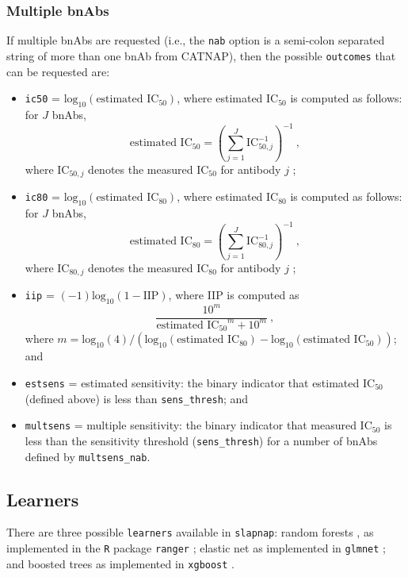 \documentclass[]{article}
\providecommand{\tightlist}{%
  \setlength{\itemsep}{0pt}\setlength{\parskip}{0pt}}
\begin{document}
\subsubsection{Multiple bnAbs}\label{multiple-bnabs}

If multiple bnAbs are requested (i.e., the \texttt{nab} option is a
semi-colon separated string of more than one bnAb from CATNAP), then the
possible \texttt{outcomes} that can be requested are:

\begin{itemize}
\tightlist
\item
  \texttt{ic50} = \(\mbox{log}_{10}(\mbox{estimated IC}_{50})\), where
  estimated IC\(_{50}\) is computed as follows: for \(J\) bnAbs,
  \[ \mbox{estimated IC}_{50} = \left( \sum_{j=1}^J \mbox{IC}_{50,j}^{-1} \right)^{-1} \ , \]
  where IC\(_{50,j}\) denotes the measured IC\(_{50}\) for antibody
  \(j\) \citep{wagh2016optimal};
\item
  \texttt{ic80} = \(\mbox{log}_{10}(\mbox{estimated IC}_{80})\), where
  estimated IC\(_{80}\) is computed as follows: for \(J\) bnAbs,
  \[ \mbox{estimated IC}_{80} = \left( \sum_{j=1}^J \mbox{IC}_{80,j}^{-1} \right)^{-1} \ , \]
  where IC\(_{80,j}\) denotes the measured IC\(_{80}\) for antibody
  \(j\) \citep{wagh2016optimal};
\item
  \texttt{iip} = \((-1)\mbox{log}_{10}(1 - \mbox{IIP})\), where IIP is
  computed as \[ \frac{10^m}{\mbox{estimated IC$_{50}$}^m + 10^m} \ , \]
  where
  \(m = \mbox{log}_{10}(4) / (\mbox{log}_{10}(\mbox{estimated IC}_{80}) - \mbox{log}_{10}(\mbox{estimated IC}_{50}))\);
  and
\item
  \texttt{estsens} = estimated sensitivity: the binary indicator that
  estimated IC\(_{50}\) (defined above) is less than
  \texttt{sens\_thresh}; and
\item
  \texttt{multsens} = multiple sensitivity: the binary indicator that
  measured IC\(_{50}\) is less than the sensitivity threshold
  (\texttt{sens\_thresh}) for a number of bnAbs defined by
  \texttt{multsens\_nab}.
\end{itemize}

\subsection{Learners}\label{sec:learnerdetails}

There are three possible \texttt{learners} available in
\texttt{slapnap}: random forests \citep{breiman2001}, as implemented in
the \texttt{R} package \texttt{ranger} \citep{rangerpkg}; elastic net
\citep{zou2005} as implemented in \texttt{glmnet} \citep{glmnetpkg}; and
boosted trees \citep{friedman2001, chen2016} as implemented in
\texttt{xgboost} \citep{xgboostpkg}.
\end{document}
